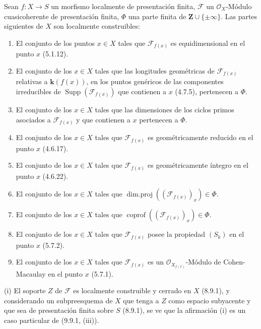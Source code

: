 \begin{proposition}[9.9.2]
\label{IV.9.9.2}
Sean $f:X\to S$ un morfismo localmente de presentación finita, $\mathcal F$
un $\mathcal O_X$-Módulo cuasicoherente de presentación finita, $\Phi$ una
parte finita de $\mathbf Z\cup\{\pm\infty\}$. Las partes siguientes de $X$
son localmente construibles:
\begin{enumerate}
\item[\textup{(i)}] El conjunto de los puntos $x\in X$ tales que $\mathcal F_{f(x)}$ es
equidimensional en el punto $x$ \textup{(5.1.12)}.
\item[\textup{(ii)}] El conjunto de los $x\in X$ tales que las longitudes geométricas de
$\mathcal F_{f(x)}$ relativas a $\boldsymbol{k}(f(x))$, en los puntos genéricos de las componentes
irreducibles de $\operatorname{Supp}(\mathcal F_{f(x)})$ que contienen a $x$
\textup{(4.7.5)}, pertenecen a $\Phi$.
\item[\textup{(iii)}] El conjunto de los $x\in X$ tales que las dimensiones de los ciclos
primos asociados a $\mathcal F_{f(x)}$ y que contienen a $x$ pertenecen a
$\Phi$.
\item[\textup{(iv)}] El conjunto de los $x\in X$ tales que $\mathcal F_{f(x)}$ es
geométricamente reducido en el punto $x$ \textup{(4.6.17)}.
\item[\textup{(v)}] El conjunto de los $x\in X$ tales que $\mathcal F_{f(x)}$ es
geométricamente íntegro en el punto $x$ \textup{(4.6.22)}.
\item[\textup{(vi)}] El conjunto de los $x\in X$ tales que
$\operatorname{dim.proj}((\mathcal F_{f(x)})_x)\in\Phi$.
\item[\textup{(vii)}] El conjunto de los $x\in X$ tales que
$\operatorname{coprof}((\mathcal F_{f(x)})_x)\in\Phi$.
\item[\textup{(viii)}] El conjunto de los $x\in X$ tales que $\mathcal F_{f(x)}$ posee la
propiedad $(S_k)$ en el punto $x$ \textup{(5.7.2)}.
\item[\textup{(ix)}] El conjunto de los $x\in X$ tales que $\mathcal F_{f(x)}$ es un
$\mathcal O_{X_{f(x)}}$-Módulo de Cohen-Macaulay en el punto $x$ \textup{(5.7.1)}.
\end{enumerate}
\end{proposition}

(i) El soporte $Z$ de $\mathcal F$ es localmente construible y cerrado en
$X$ (8.9.1), y considerando un subpreesquema de $X$ que tenga a $Z$ como espacio
subyacente y que sea de presentación finita sobre $S$ (8.9.1), se ve que
la afirmación (i) es un caso particular de (9.9.1, (iii)).

